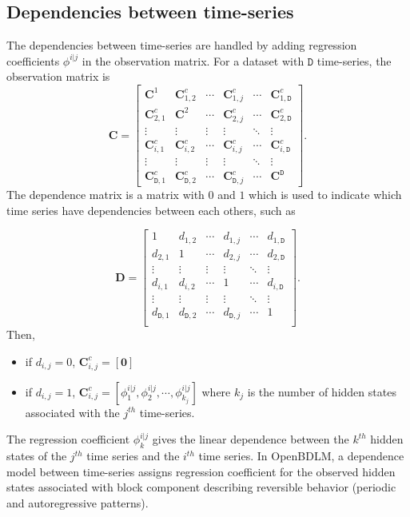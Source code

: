 \subsection{Dependencies between time-series}
\label{S:Dependencies}
The dependencies between time-series are handled by adding regression coefficients $\phi^{i|j}$ in the observation matrix.
For a dataset with $\mathtt{D}$ time-series, the observation matrix is
\begin{equation*}
\mathbf{C}=\left[\begin{array}{cccccc}
\mathbf{C}^{1}& \mathbf{C}_{1,2}^{c}&\cdots & \mathbf{C}_{1,j}^{c}&\cdots& \mathbf{C}_{1,\mathtt{D}}^{c}\\
\mathbf{C}_{2,1}^{c}& \mathbf{C}^{2}&\cdots& \mathbf{C}_{2,j}^{c}&\cdots& \mathbf{C}_{2,\mathtt{D}}^{c}\\
\vdots&\vdots& \vdots& \vdots& \ddots& \vdots\\
\mathbf{C}_{i,1}^{c}& \mathbf{C}_{i,2}^{c}&\cdots&\mathbf{C}_{i,j}^{c}&\cdots&\mathbf{C}_{i,\mathtt{D}}^{c}\\
\vdots&\vdots& \vdots& \vdots& \ddots& \vdots\\
\mathbf{C}_{\mathtt{D},1}^{c}& \mathbf{C}_{\mathtt{D},2}^{c}&\cdots& \mathbf{C}_{\mathtt{D},j}^{c}&\cdots& \mathbf{C}^{\mathtt{D}}
\end{array}\right] \text{.}
\end{equation*}
The dependence matrix is a matrix with $0$ and $1$ which is used to indicate which time series have dependencies between each others, such as 

\begin{equation*}
\mathbf{D}=\left[\begin{array}{cccccc}
1&d_{1,2}&\cdots&d_{1,j}&\cdots&d_{1,\mathtt{D}}\\
d_{2,1}&1&\cdots&d_{2,j}&\cdots&d_{2,\mathtt{D}}\\
\vdots&\vdots&\vdots&\vdots&\ddots&\vdots\\
d_{i,1}&d_{i,2}&\cdots&1&\cdots&d_{i,\mathtt{D}}\\
\vdots&\vdots&\vdots&\vdots&\ddots&\vdots\\
d_{\mathtt{D},1}&d_{\mathtt{D},2}&\cdots&d_{\mathtt{D},j}&\cdots&1\\
\end{array}\right] \text{.}
\end{equation*}
Then, 
\begin{itemize}
\item if $d_{i,j}=0$, $\mathbf{C}_{i,j}^{c}=[\mathbf{0}]$
\item if $d_{i,j}=1$, $\mathbf{C}_{i,j}^{c}=\left[\phi^{i|j}_{1},\phi^{i|j}_{2},\cdots,\phi^{i|j}_{k_{j}}\right]$ where $k_{j}$ is the number of hidden states associated with the $j^{th}$ time-series.
\end{itemize}
The regression coefficient $\phi^{i|j}_{k}$ gives the linear dependence between the $k^{th}$ hidden states of the $j^{th}$ time series and the $i^{th}$ time series.
In OpenBDLM, a dependence model between time-series assigns regression coefficient for the observed hidden states associated with block component describing reversible behavior (periodic and autoregressive patterns).
